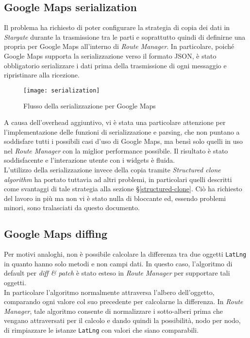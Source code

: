 \subsection{Google Maps serialization}

Il problema ha richiesto di poter configurare la strategia di copia dei dati in \textit{Stargate} durante la trasmissione tra le parti e soprattutto quindi di definirne una propria per Google Maps all'interno di \textit{Route Manager}. In particolare, poiché Google Maps supporta la serializzazione verso il formato \gls{JSON}, è stato obbligatorio serializzare i dati prima della trasmissione di ogni messaggio e ripristinare alla ricezione.

\begin{figure}[H] 
  \centering 
  \texttt{[image: serialization]} 
  \caption{Flusso della serializzazione per Google Maps}
\end{figure}

A causa dell'overhead aggiuntivo, vi è stata una particolare attenzione per l'implementazione delle funzioni di serializzazione e parsing, che non puntano a soddisfare tutti i possibili casi d'uso di Google Maps, ma bensì solo quelli in uso nel \textit{Route Manager} con la miglior performance possibile. Il risultato è stato soddisfacente e l'interazione utente con i widgets è fluida. \\

L'utilizzo della serializzazione invece della copia tramite \textit{Structured clone algorithm} ha portato tuttavia ad altri problemi, in particolari quelli descritti come svantaggi di tale strategia alla sezione §\ref{structured-clone}. Ciò ha richiesto del lavoro in più ma non vi è stato nulla di bloccante ed, essendo problemi minori, sono tralasciati da questo documento.

\subsection{Google Maps diffing}

Per motivi analoghi, non è possibile calcolare la differenza tra due oggetti \texttt{LatLng} in quanto hanno solo metodi e non campi dati. In questo caso, l'algoritmo di default per \textit{diff \& patch} è stato esteso in \textit{Route Manager} per supportare tali oggetti. \\

In particolare l'algoritmo normalmente attraversa l'albero dell'oggetto, comparando ogni valore col suo precedente per calcolarne la differenza. In \textit{Route Manager}, tale algoritmo consente di normalizzare i sotto-alberi prima che vengano attraversati per il calcolo e dando quindi la possibilità, nodo per nodo, di rimpiazzare le istanze \texttt{LatLng} con valori che siano comparabili. 

